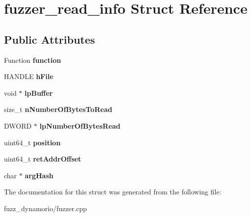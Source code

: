 \hypertarget{structfuzzer__read__info}{}\section{fuzzer\+\_\+read\+\_\+info Struct Reference}
\label{structfuzzer__read__info}
\subsection*{Public Attributes}
\begin{DoxyCompactItemize}
\item 
\mbox{\label{structfuzzer__read__info_a4eef33b10620f65a6f40120622563726}} 
Function {\bfseries function}
\item 
\mbox{\label{structfuzzer__read__info_a52ff77581853e3ceb3a096b7a0269e7d}} 
H\+A\+N\+D\+LE {\bfseries h\+File}
\item 
\mbox{\label{structfuzzer__read__info_a94f0b56d5307efee9f29c02721dc6c87}} 
void $\ast$ {\bfseries lp\+Buffer}
\item 
\mbox{\label{structfuzzer__read__info_a3465e20f9ab8fc70da679d171d845341}} 
size\+\_\+t {\bfseries n\+Number\+Of\+Bytes\+To\+Read}
\item 
\mbox{\label{structfuzzer__read__info_a6b76cdb16ffe2a6c4b9adf1b0d74a998}} 
D\+W\+O\+RD $\ast$ {\bfseries lp\+Number\+Of\+Bytes\+Read}
\item 
\mbox{\label{structfuzzer__read__info_a5e3bbc64af9e76d7fc20ab3ddcaa4815}} 
uint64\+\_\+t {\bfseries position}
\item 
\mbox{\label{structfuzzer__read__info_a1e5ec7bfcd8516356715e3fe75245767}} 
uint64\+\_\+t {\bfseries ret\+Addr\+Offset}
\item 
\mbox{\label{structfuzzer__read__info_a426b072144275f47858db56e7c1ebb40}} 
char $\ast$ {\bfseries arg\+Hash}
\end{DoxyCompactItemize}


The documentation for this struct was generated from the following file\+:\begin{DoxyCompactItemize}
\item 
fuzz\+\_\+dynamorio/fuzzer.\+cpp\end{DoxyCompactItemize}

